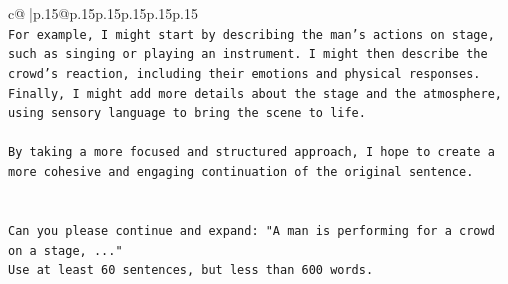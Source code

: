 \documentclass{article}
\begin{document}
{\begin{supertabular}{c@{$\;$}|p{.15\linewidth}@{}p{.15\linewidth}p{.15\linewidth}p{.15\linewidth}p{.15\linewidth}p{.15\linewidth}}
{{{\\ 
\texttt{For example, I might start by describing the man's actions on stage, such as singing or playing an instrument. I might then describe the crowd's reaction, including their emotions and physical responses. Finally, I might add more details about the stage and the atmosphere, using sensory language to bring the scene to life.} \\
\\ 
\texttt{By taking a more focused and structured approach, I hope to create a more cohesive and engaging continuation of the original sentence.} \\
\\ 
\\ 
\texttt{Can you please continue and expand: "A man is performing for a crowd on a stage, ..."} \\
\texttt{Use at least 60 sentences, but less than 600 words.} \\
            }
        }
    }
     \\ \\


\end{supertabular}}
\end{document}
